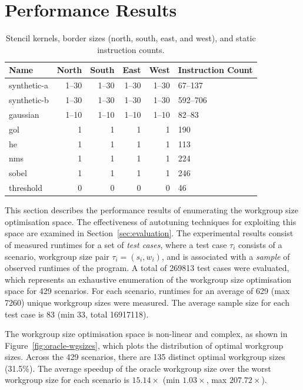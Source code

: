 \documentclass[preprint,nonatbib,10pt,nocopyrightspace]{sigplanconf}
\begin{document}
  \section{Performance Results}\label{sec:results}

  \begin{table}
    \scriptsize
    \centering
    \begin{tabular}{lrrrrR{1.4cm}}
      \toprule
      Name & North & South & East & West & Instruction Count \\
      \midrule
      synthetic-a & 1--30 & 1--30 & 1--30 & 1--30 & 67--137\\
      synthetic-b & 1--30 & 1--30 & 1--30 & 1--30 & 592--706\\
      gaussian & 1--10 & 1--10 & 1--10 & 1--10 & 82--83 \\
      gol & 1 & 1 & 1 & 1 & 190 \\
      he & 1 & 1 & 1 & 1 & 113 \\
      nms & 1 & 1 & 1 & 1 & 224 \\
      sobel & 1 & 1 & 1 & 1 & 246 \\
      threshold & 0 & 0 & 0 & 0 & 46 \\
      \bottomrule
    \end{tabular}
    \caption{%
    Stencil kernels, border sizes (north, south, east, and west), and static
    instruction counts.
    \vspace{-1.5em}
    }
    \label{tab:kernels}
  \end{table}

  This section describes the performance results of enumerating the workgroup size
  optimisation space. The effectiveness of autotuning techniques for exploiting
  this space are examined in Section~\ref{sec:evaluation}. The experimental
  results consist of measured runtimes for a set of \emph{test cases}, where a
  test case $\tau_i$ consists of a scenario, workgroup size pair $\tau_i =
  (s_i,w_i)$, and is associated with a \emph{sample} of observed runtimes of the
  program. A total of 269813 test cases were evaluated, which represents an
  exhaustive enumeration of the workgroup size optimisation space for 429
  scenarios. For each scenario, runtimes for an average of 629 (max 7260) unique
  workgroup sizes were measured. The average sample size for each test case is 83
  (min 33, total 16917118).

  The workgroup size optimisation space is non-linear and complex, as shown in
  Figure~\ref{fig:oracle-wgsizes}, which plots the distribution of optimal
  workgroup sizes. Across the 429 scenarios, there are 135 distinct optimal
  workgroup sizes (31.5\%). The average speedup of the oracle workgroup size over
  the worst workgroup size for each scenario is $15.14\times$ (min $1.03\times$,
  max $207.72\times$).
\end{document}

